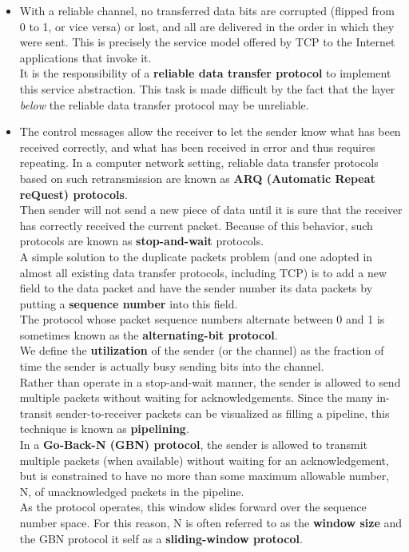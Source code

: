 \begin{itemize}
\item
With a reliable channel, no transferred data bits are corrupted (flipped from 0 to 1, or vice versa) or lost, and all are delivered in the order in which they were sent. This is precisely the service model offered by TCP to the Internet applications that invoke it.\\
It is the responsibility of a \textbf{reliable data transfer protocol} to implement this service abstraction. This task is made difficult by the fact that the layer \textit{below} the reliable data transfer protocol may be unreliable.

\item
The control messages allow the receiver to let the sender know what has been received correctly, and what has been received in error and thus requires repeating. In a computer network setting, reliable data transfer protocols based on such retransmission are known as \textbf{ARQ (Automatic Repeat reQuest) protocols}.\\
Then sender will not send a new piece of data until it is sure that the receiver has correctly received the current packet. Because of this behavior, such protocols are known as \textbf{stop-and-wait} protocols.\\
A simple solution to the duplicate packets problem (and one adopted in almost all existing data transfer protocols, including TCP) is to add a new field to the data packet and have the sender number its data packets by putting a \textbf{sequence number} into this field.\\
The protocol whose packet sequence numbers alternate between 0 and 1 is sometimes known as the \textbf{alternating-bit protocol}.\\
We define the \textbf{utilization} of the sender (or the channel) as the fraction of time the sender is actually busy sending bits into the channel.\\
Rather than operate in a stop-and-wait manner, the sender is allowed to send multiple packets without waiting for acknowledgements. Since the many in-transit sender-to-receiver packets can be visualized as filling a pipeline, this technique is known as \textbf{pipelining}.\\
In a \textbf{Go-Back-N (GBN) protocol}, the sender is allowed to transmit multiple packets (when available) without waiting for an acknowledgement, but is constrained to have no more than some maximum allowable number, N, of unacknowledged packets in the pipeline.\\
As the protocol operates, this window slides forward over the sequence number space. For this reason, N is often referred to as the \textbf{window size} and the GBN protocol it self as a \textbf{sliding-window protocol}.\\

\end{itemize}
